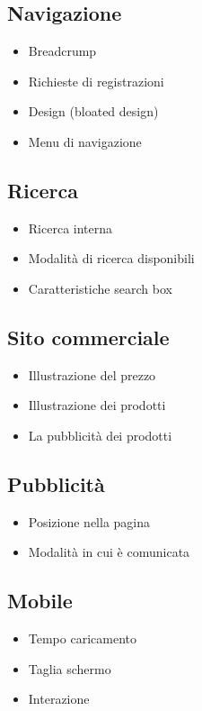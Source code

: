 			\subsection*{Navigazione}
				\begin{itemize}
					\item Breadcrump
					\item Richieste di registrazioni
					\item Design (bloated design)
					\item Menu di navigazione
				\end{itemize}
			
			\subsection*{Ricerca}
				\begin{itemize}
					\item Ricerca interna
					\item Modalità di ricerca disponibili
					\item Caratteristiche search box
				\end{itemize}
			
			\subsection*{Sito commerciale}
				\begin{itemize}
					\item Illustrazione del prezzo
					\item Illustrazione dei prodotti
					\item La pubblicità dei prodotti
				\end{itemize}
			
			\subsection*{Pubblicità}
				\begin{itemize}
					\item Posizione nella pagina
					\item Modalità in cui è comunicata
				\end{itemize}
			
			\subsection*{Mobile}
				\begin{itemize}
					\item Tempo caricamento
					\item Taglia schermo
					\item Interazione
				\end{itemize}
				
